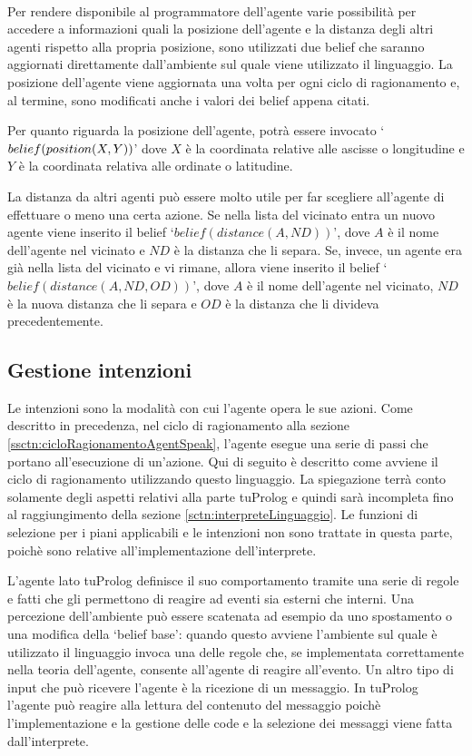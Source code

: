 \paragraph*{}
Per rendere disponibile al programmatore dell'agente varie possibilità per accedere a informazioni quali la posizione dell'agente e la distanza degli altri agenti rispetto alla propria posizione, sono utilizzati due belief che saranno aggiornati direttamente dall'ambiente sul quale viene utilizzato il linguaggio. La posizione dell'agente viene aggiornata una volta per ogni ciclo di ragionamento e, al termine, sono modificati anche i valori dei belief appena citati.

Per quanto riguarda la posizione dell'agente, potrà essere invocato `$be\-lief(po\-si\-tion(X, Y))$' dove $X$ è la coordinata relative alle ascisse o longitudine e $Y$ è la coordinata relativa alle ordinate o latitudine.

La distanza da altri agenti può essere molto utile per far scegliere all'agente di effettuare o meno una certa azione. Se nella lista del vicinato entra un nuovo agente viene inserito il belief `$belief(distance(A, ND))$', dove $A$ è il nome dell'agente nel vicinato e $ND$ è la distanza che li separa. Se, invece, un agente era già nella lista del vicinato e vi rimane, allora viene inserito il belief `$belief(distance(A, ND, OD))$', dove $A$ è il nome dell'agente nel vicinato, $ND$ è la nuova distanza che li separa e $OD$ è la distanza che li divideva precedentemente.

\subsection{Gestione intenzioni}
Le intenzioni sono la modalità con cui l'agente opera le sue azioni. Come descritto in precedenza, nel ciclo di ragionamento alla sezione \ref{ssctn:cicloRagionamentoAgentSpeak}, l'agente esegue una serie di passi che portano all'esecuzione di un'azione.
Qui di seguito è descritto come avviene il ciclo di ragionamento utilizzando questo linguaggio. La spiegazione terrà conto solamente degli aspetti relativi alla parte tuProlog e quindi sarà incompleta fino al raggiungimento della sezione \ref{sctn:interpreteLinguaggio}. Le funzioni di selezione per i piani applicabili e le intenzioni non sono trattate in questa parte, poichè sono relative all'implementazione dell'interprete.

L'agente lato tuProlog definisce il suo comportamento tramite una serie di regole e fatti che gli permettono di reagire ad eventi sia esterni che interni. Una percezione dell'ambiente può essere scatenata ad esempio da uno spostamento o una modifica della `belief base': quando questo avviene l'ambiente sul quale è utilizzato il linguaggio invoca una delle regole che, se implementata correttamente nella teoria dell'agente, consente all'agente di reagire all'evento. Un altro tipo di input che può ricevere l'agente è la ricezione di un messaggio. In tuProlog l'agente può reagire alla lettura del contenuto del messaggio poichè l'implementazione e la gestione delle code e la selezione dei messaggi viene fatta dall'interprete.

